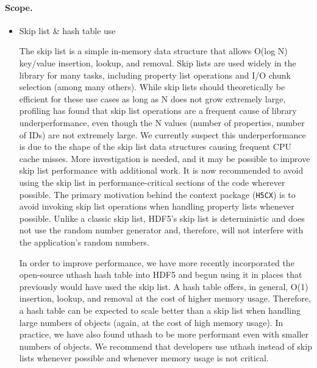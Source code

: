 



\paragraph{Scope.}

\begin{itemize}
    \item Skip list \& hash table use

The skip list is a simple in-memory data structure that allows O(log N) key/value insertion, lookup, and removal. Skip lists are used widely in the library for many tasks, including property list operations and I/O chunk selection (among many others). While skip lists should theoretically be efficient for these use cases as long as N does not grow extremely large, profiling has found that skip list operations are a frequent cause of library underperformance, even though the N values (number of properties, number of IDs) are not extremely large. We currently suspect this underperformance is due to the shape of the skip list data structures causing frequent CPU cache misses. More investigation is needed, and it may be possible to improve skip list performance with additional work. It is now recommended to avoid using the skip list in performance-critical sections of the code wherever possible. The primary motivation behind the context package (\texttt{H5CX}) is to avoid invoking skip list operations when handling property lists whenever possible. Unlike a classic skip list, HDF5's skip list is deterministic and does not use the random number generator and, therefore, will not interfere with the application's random numbers.

In order to improve performance, we have more recently incorporated the open-source uthash \cite{uthash} hash table into HDF5 and begun using it in places that previously would have used the skip list. A hash table offers, in general, O(1) insertion, lookup, and removal at the cost of higher memory usage. Therefore, a hash table can be expected to scale better than a skip list when handling large numbers of objects (again, at the cost of high memory usage). In practice, we have also found uthash to be more performant even with smaller numbers of objects. We recommend that developers use uthash instead of skip lists whenever possible and whenever memory usage is not critical.


\end{itemize}
